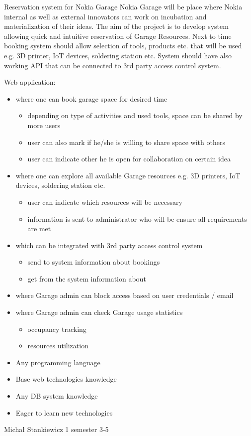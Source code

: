 \begin{project}
{Reservation system for Nokia Garage}
{Nokia Garage will be place where Nokia internal as well as external innovators can work on incubation and materialization of their ideas.
The aim of the project is to develop system allowing quick and intuitive reservation of Garage Resources. Next to time booking system should allow selection of tools, products etc. that will be used e.g. 3D printer, IoT devices, soldering station etc. 
System should have also working API that can be connected to 3rd party access control system.} 
{
Web application:
\begin{itemize}
	\item where one can book garage space for desired time
		\begin{itemize}
			\item depending on type of activities and used tools, space can be shared by more users
			\item user can also mark if he/she is willing to share space with others
			\item user can indicate other he is open for collaboration on certain idea
		\end{itemize}
	\item where one can explore all available Garage  resources e.g. 3D printers, IoT devices, soldering station etc.
		\begin{itemize}
			\item user can indicate which resources will be necessary
			\item information is sent to administrator who will be ensure all requirements are met
		\end{itemize}
	\item which can be integrated with 3rd party access control system
		\begin{itemize}
			\item send to system information about bookings
			\item get from the system information about 
		\end{itemize}
	\item where Garage admin can block access based on user credentials / email
	\item where Garage admin can check Garage usage statistics
		\begin{itemize}
			\item occupancy tracking
			\item resources utilization 
		\end{itemize}
\end{itemize}
}
{
\begin{itemize}
	\item Any programming language
	\item Base web technologies knowledge
	\item Any DB system knowledge
	\item Eager to learn new technologies
\end{itemize}
}
{Michał Stankiewicz}
{1 semester}
{3-5}
\end{project}
